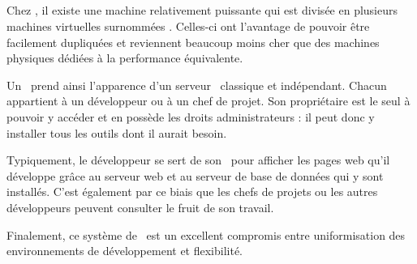 \subsection{\avservers}

Chez \asl, il existe une machine relativement puissante qui est divisée en plusieurs machines virtuelles surnommées \avservers. Celles-ci ont l'avantage de pouvoir être facilement dupliquées et reviennent beaucoup moins cher que des machines physiques dédiées à la performance équivalente. 

Un \avserver\ prend ainsi l'apparence d'un serveur \alinux\ classique et indépendant. Chacun appartient à un développeur ou à un chef de projet. Son propriétaire est le seul à pouvoir y accéder et en possède les droits administrateurs : il peut donc y installer tous les outils dont il aurait besoin.

Typiquement, le développeur se sert de son \avserver\ pour afficher les pages web qu'il développe grâce au serveur web et au serveur de base de données qui y sont installés. C'est également par ce biais que les chefs de projets ou les autres développeurs peuvent consulter le fruit de son travail.

Finalement, ce système de \avservers\ est un excellent compromis entre uniformisation des environnements de développement et flexibilité.
